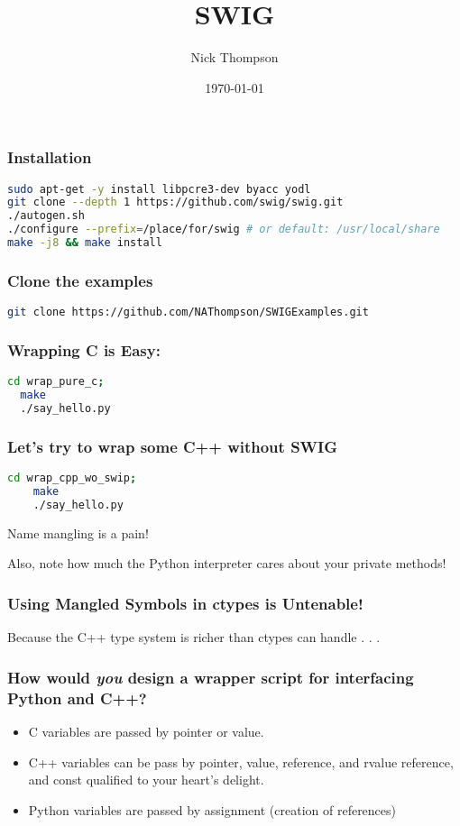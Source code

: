 \documentclass{beamer}
\begin{document}
\title{SWIG}
\author{Nick Thompson} 
\date{\today} 

\frame{\titlepage} 


\begin{frame}[fragile]
\frametitle{Installation}

\begin{lstlisting}[language=bash]
sudo apt-get -y install libpcre3-dev byacc yodl
git clone --depth 1 https://github.com/swig/swig.git
./autogen.sh
./configure --prefix=/place/for/swig # or default: /usr/local/share
make -j8 && make install
\end{lstlisting}
\end{frame}

\begin{frame}[fragile]
  \frametitle{Clone the examples}
  \begin{lstlisting}[language=bash]
    git clone https://github.com/NAThompson/SWIGExamples.git
  \end{lstlisting}
\end{frame}

\begin{frame}[fragile]
\frametitle{Wrapping C is Easy:}
\begin{lstlisting}[language=bash]
  cd wrap_pure_c;
  make
  ./say_hello.py
\end{lstlisting}
\end{frame}

\begin{frame}[fragile]
  \frametitle{Let's try to wrap some C++ without SWIG}
  \begin{lstlisting}[language=bash]
    cd wrap_cpp_wo_swip;
    make
    ./say_hello.py
  \end{lstlisting}
  Name mangling is a pain!
  
  Also, note how much the Python interpreter cares about your private methods!
\end{frame}

\begin{frame}
  \frametitle{Using Mangled Symbols in ctypes is Untenable!}
  Because the C++ type system is richer than ctypes can handle . . . 
\end{frame}

\begin{frame}
  \frametitle{How would \emph{you} design a wrapper script for interfacing Python and C++?}
  \begin{itemize}
    \item C variables are passed by pointer or value.
    \item C++ variables can be pass by pointer, value, reference, and rvalue reference, and const qualified to your heart's delight.
    \item Python variables are passed by assignment (creation of references)
  \end{itemize}

\end{frame}
\end{document}
